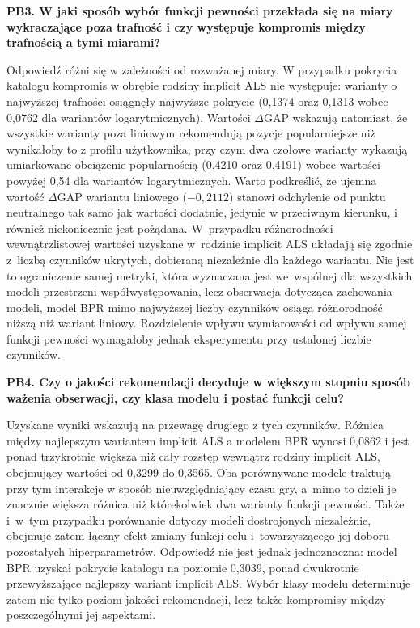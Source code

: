 \textbf{PB3. W jaki sposób wybór funkcji pewności przekłada się na miary wykraczające poza trafność i czy występuje kompromis między trafnością a tymi miarami?}

Odpowiedź różni się w zależności od rozważanej miary. W przypadku pokrycia katalogu kompromis w obrębie rodziny implicit ALS nie występuje: warianty o najwyższej trafności osiągnęły najwyższe pokrycie (0,1374 oraz 0,1313 wobec 0,0762 dla wariantów logarytmicznych). Wartości $\Delta$GAP wskazują natomiast, że wszystkie warianty poza liniowym rekomendują pozycje popularniejsze niż wynikałoby to z profilu użytkownika, przy czym dwa czołowe warianty wykazują umiarkowane obciążenie popularnością (0,4210 oraz 0,4191) wobec wartości powyżej 0,54 dla wariantów logarytmicznych. Warto podkreślić, że ujemna wartość $\Delta$GAP wariantu liniowego ($-0{,}2112$) stanowi odchylenie od punktu neutralnego tak samo jak wartości dodatnie, jedynie w przeciwnym kierunku, i również niekoniecznie jest pożądana. W~przypadku różnorodności wewnątrzlistowej wartości uzyskane w~rodzinie implicit ALS układają się zgodnie z~liczbą czynników ukrytych, dobieraną niezależnie dla każdego wariantu. Nie jest to ograniczenie samej metryki, która wyznaczana jest we~wspólnej dla wszystkich modeli przestrzeni współwystępowania, lecz obserwacja dotycząca zachowania modeli, model BPR mimo najwyższej liczby czynników osiąga różnorodność niższą niż wariant liniowy. Rozdzielenie wpływu wymiarowości od wpływu samej funkcji pewności wymagałoby jednak eksperymentu przy ustalonej liczbie czynników.

\textbf{PB4. Czy o jakości rekomendacji decyduje w większym stopniu sposób ważenia obserwacji, czy klasa modelu i postać funkcji celu?}

Uzyskane wyniki wskazują na przewagę drugiego z tych czynników. Różnica \ndcg{} między najlepszym wariantem implicit ALS a modelem BPR wynosi 0,0862 i jest ponad trzykrotnie większa niż cały rozstęp wewnątrz rodziny implicit ALS, obejmujący wartości od 0,3299 do 0,3565. Oba porównywane modele traktują przy tym interakcje w sposób nieuwzględniający czasu gry, a~mimo to dzieli je znacznie większa różnica niż którekolwiek dwa warianty funkcji pewności. Także i~w~tym przypadku porównanie dotyczy modeli dostrojonych niezależnie, obejmuje zatem łączny efekt zmiany funkcji celu i~towarzyszącego jej doboru pozostałych hiperparametrów. Odpowiedź nie jest jednak jednoznaczna: model BPR uzyskał pokrycie katalogu na poziomie 0,3039, ponad dwukrotnie przewyższające najlepszy wariant implicit ALS. Wybór klasy modelu determinuje zatem nie tylko poziom jakości rekomendacji, lecz także kompromisy między poszczególnymi jej aspektami.

